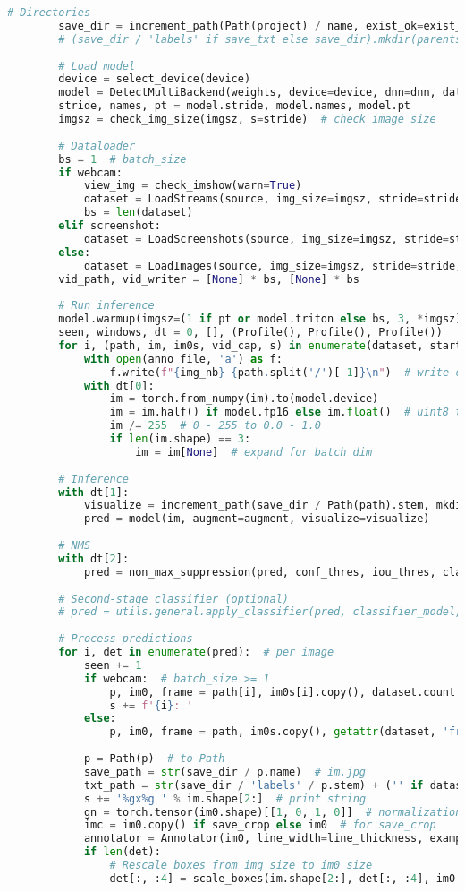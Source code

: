 \begin{lstlisting}[language=Python]
		# Directories
		save_dir = increment_path(Path(project) / name, exist_ok=exist_ok)  # increment run
		# (save_dir / 'labels' if save_txt else save_dir).mkdir(parents=True, exist_ok=True)  # make dir
		
		# Load model
		device = select_device(device)
		model = DetectMultiBackend(weights, device=device, dnn=dnn, data=data, fp16=half)
		stride, names, pt = model.stride, model.names, model.pt
		imgsz = check_img_size(imgsz, s=stride)  # check image size
		
		# Dataloader
		bs = 1  # batch_size
		if webcam:
			view_img = check_imshow(warn=True)
			dataset = LoadStreams(source, img_size=imgsz, stride=stride, auto=pt, vid_stride=vid_stride)
			bs = len(dataset)
		elif screenshot:
			dataset = LoadScreenshots(source, img_size=imgsz, stride=stride, auto=pt)
		else:
			dataset = LoadImages(source, img_size=imgsz, stride=stride, auto=pt, vid_stride=vid_stride)
		vid_path, vid_writer = [None] * bs, [None] * bs
		
		# Run inference
		model.warmup(imgsz=(1 if pt or model.triton else bs, 3, *imgsz))  # warmup
		seen, windows, dt = 0, [], (Profile(), Profile(), Profile())
		for i, (path, im, im0s, vid_cap, s) in enumerate(dataset, start=1):
			with open(anno_file, 'a') as f:
				f.write(f"{img_nb} {path.split('/')[-1]}\n")  # write canvas and image name
			with dt[0]:
				im = torch.from_numpy(im).to(model.device)
				im = im.half() if model.fp16 else im.float()  # uint8 to fp16/32
				im /= 255  # 0 - 255 to 0.0 - 1.0
				if len(im.shape) == 3:
					im = im[None]  # expand for batch dim
	
		# Inference
		with dt[1]:
			visualize = increment_path(save_dir / Path(path).stem, mkdir=True) if visualize else False
			pred = model(im, augment=augment, visualize=visualize)
	
		# NMS
		with dt[2]:
			pred = non_max_suppression(pred, conf_thres, iou_thres, classes, agnostic_nms, max_det=max_det)
	
		# Second-stage classifier (optional)
		# pred = utils.general.apply_classifier(pred, classifier_model, im, im0s)
		
		# Process predictions
		for i, det in enumerate(pred):  # per image
			seen += 1
			if webcam:  # batch_size >= 1
				p, im0, frame = path[i], im0s[i].copy(), dataset.count
				s += f'{i}: '
			else:
				p, im0, frame = path, im0s.copy(), getattr(dataset, 'frame', 0)
	
			p = Path(p)  # to Path
			save_path = str(save_dir / p.name)  # im.jpg
			txt_path = str(save_dir / 'labels' / p.stem) + ('' if dataset.mode == 'image' else f'_{frame}')  # im.txt
			s += '%gx%g ' % im.shape[2:]  # print string
			gn = torch.tensor(im0.shape)[[1, 0, 1, 0]]  # normalization gain whwh
			imc = im0.copy() if save_crop else im0  # for save_crop
			annotator = Annotator(im0, line_width=line_thickness, example=str(names))
			if len(det):
				# Rescale boxes from img_size to im0 size
				det[:, :4] = scale_boxes(im.shape[2:], det[:, :4], im0.shape).round()
	

\end{lstlisting}
